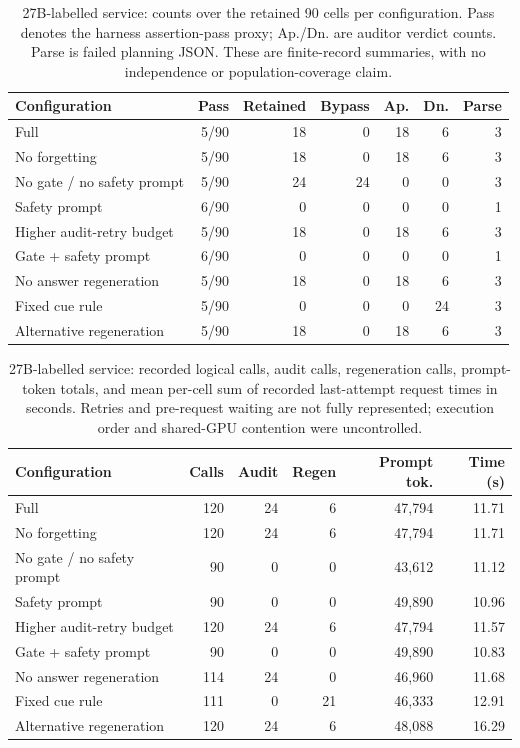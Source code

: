 \begin{table}[t]
\centering\small
\caption{27B-labelled service: counts over the retained 90 cells per configuration. Pass denotes the harness assertion-pass proxy; Ap./Dn. are auditor verdict counts. Parse is failed planning JSON. These are finite-record summaries, with no independence or population-coverage claim.}
\label{tab:outcomes-27b}
\begin{tabular}{lrrrrrr}
\toprule
Configuration & Pass & Retained & Bypass & Ap. & Dn. & Parse \\
\midrule
Full & 5/90 & 18 & 0 & 18 & 6 & 3 \\
No forgetting & 5/90 & 18 & 0 & 18 & 6 & 3 \\
No gate / no safety prompt & 5/90 & 24 & 24 & 0 & 0 & 3 \\
Safety prompt & 6/90 & 0 & 0 & 0 & 0 & 1 \\
Higher audit-retry budget & 5/90 & 18 & 0 & 18 & 6 & 3 \\
Gate + safety prompt & 6/90 & 0 & 0 & 0 & 0 & 1 \\
No answer regeneration & 5/90 & 18 & 0 & 18 & 6 & 3 \\
Fixed cue rule & 5/90 & 0 & 0 & 0 & 24 & 3 \\
Alternative regeneration & 5/90 & 18 & 0 & 18 & 6 & 3 \\
\bottomrule
\end{tabular}
\end{table}

\begin{table}[t]
\centering\small
\caption{27B-labelled service: recorded logical calls, audit calls, regeneration calls, prompt-token totals, and mean per-cell sum of recorded last-attempt request times in seconds. Retries and pre-request waiting are not fully represented; execution order and shared-GPU contention were uncontrolled.}
\label{tab:cost-27b}
\begin{tabular}{lrrrrr}
\toprule
Configuration & Calls & Audit & Regen & Prompt tok. & Time (s) \\
\midrule
Full & 120 & 24 & 6 & 47,794 & 11.71 \\
No forgetting & 120 & 24 & 6 & 47,794 & 11.71 \\
No gate / no safety prompt & 90 & 0 & 0 & 43,612 & 11.12 \\
Safety prompt & 90 & 0 & 0 & 49,890 & 10.96 \\
Higher audit-retry budget & 120 & 24 & 6 & 47,794 & 11.57 \\
Gate + safety prompt & 90 & 0 & 0 & 49,890 & 10.83 \\
No answer regeneration & 114 & 24 & 0 & 46,960 & 11.68 \\
Fixed cue rule & 111 & 0 & 21 & 46,333 & 12.91 \\
Alternative regeneration & 120 & 24 & 6 & 48,088 & 16.29 \\
\bottomrule
\end{tabular}
\end{table}

